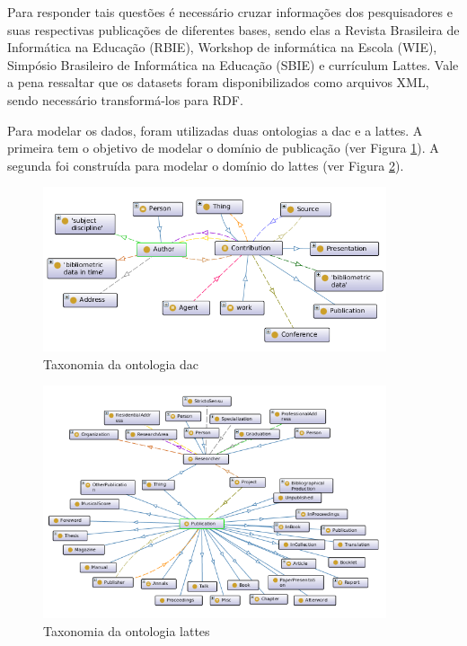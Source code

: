 Para responder tais questões é necessário cruzar informações dos pesquisadores e suas respectivas publicações de diferentes bases, sendo elas a Revista Brasileira de Informática na Educação (RBIE), Workshop de informática na Escola (WIE), Simpósio Brasileiro de Informática na Educação (SBIE) e currículum Lattes. Vale a pena ressaltar que os datasets foram disponibilizados como arquivos XML, sendo necessário transformá-los para RDF.

Para modelar os dados, foram utilizadas duas ontologias a dac e a lattes. A primeira tem o objetivo de modelar o domínio de publicação (ver Figura \ref{fig:dac}). A segunda foi construída para modelar o domínio do lattes (ver Figura \ref{fig:lattes}).

\begin{figure}[!ht]
	\centering
	\includegraphics[width=0.9\textwidth]{./imagens/dac-mainview.png}
    \caption{Taxonomia da ontologia dac}
	\label{fig:dac}
\end{figure}

\begin{figure}[!ht]
	\centering
	\includegraphics[width=0.9\textwidth]{./imagens/lattes-mainview.png}
    \caption{Taxonomia da ontologia lattes}
	\label{fig:lattes}
\end{figure}

